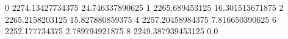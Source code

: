 0 2274.13427734375 24.746337890625
1 2265.689453125 16.301513671875
2 2265.2158203125 15.827880859375
4 2257.20458984375 7.816650390625
6 2252.177734375 2.789794921875
8 2249.387939453125 0.0
